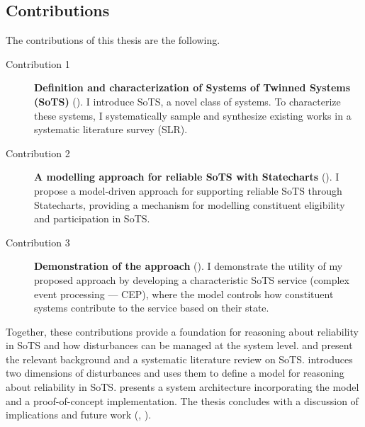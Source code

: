\subsection*{Contributions}

The contributions of this thesis are the following.

\begin{description}
    \item[Contribution 1] \textbf{Definition and characterization of Systems of Twinned Systems (SoTS)} (). I introduce SoTS, a novel class of systems. To characterize these systems, I systematically sample and synthesize existing works in a systematic literature survey (SLR).

    \item[Contribution 2] \textbf{A modelling approach for reliable SoTS with Statecharts} (). I propose a model-driven approach for supporting reliable SoTS through Statecharts, providing a mechanism for modelling constituent eligibility and participation in SoTS.

    \item[Contribution 3] \textbf{Demonstration of the approach} (). I demonstrate the utility of my proposed approach by developing a characteristic SoTS service (complex event processing --- CEP), where the model controls how constituent systems contribute to the service based on their state.
    
\end{description}


Together, these contributions provide a foundation for reasoning about reliability in SoTS and how disturbances can be managed at the system level.  and  present the relevant background and a systematic literature review on SoTS.  introduces two dimensions of disturbances and uses them to define a model for reasoning about reliability in SoTS.  presents a system architecture incorporating the model and a proof-of-concept implementation. The thesis concludes with a discussion of implications and future work (, ).

